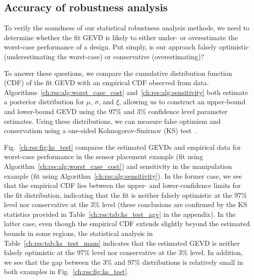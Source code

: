 
\subsection{Accuracy of robustness analysis}\label{ch:rss:soundness}

To verify the soundness of our statistical robustness analysis methods, we need to determine whether the fit GEVD is likely to either under- or overestimate the worst-case performance of a design. Put simply, is our approach falsely optimistic (underestimating the worst-case) or conservative (overestimating)?

To answer these questions, we compare the cumulative distribution function (CDF) of the fit GEVD with an empirical CDF observed from data. Algorithms~\ref{ch:rss:alg:worst_case_cost} and~\ref{ch:rss:alg:sensitivity} both estimate a posterior distribution for $\mu$, $\sigma$, and $\xi$, allowing us to construct an upper-bound and lower-bound GEVD using the 97\% and 3\% confidence level parameter estimates. Using these distributions, we can measure false optimism and conservatism using a one-sided Kolmogorov-Smirnov (KS) test~\cite{nist_ks}.

Fig.~\ref{ch:rss:fig:ks_test} compares the estimated GEVDs and empirical data for worst-case performance in the sensor placement example (fit using Algorithm~\ref{ch:rss:alg:worst_case_cost}) and sensitivity in the manipulation example (fit using Algorithm~\ref{ch:rss:alg:sensitivity}). In the former case, we see that the empirical CDF lies between the upper- and lower-confidence limits for the fit distribution, indicating that the fit is neither falsely optimistic at the 97\% level nor conservative at the 3\% level (these conclusions are confirmed by the KS statistics provided in Table~\ref{ch:rss:tab:ks_test_agv} in the appendix). In the latter case, even though the empirical CDF extends slightly beyond the estimated bounds in some regions, the statistical analysis in Table~\ref{ch:rss:tab:ks_test_mam} indicates that the estimated GEVD is neither falsely optimistic at the 97\% level nor conservative at the 3\% level. In addition, we see that the gap between the 3\% and 97\% distributions is relatively small in both examples in Fig.~\ref{ch:rss:fig:ks_test}.

